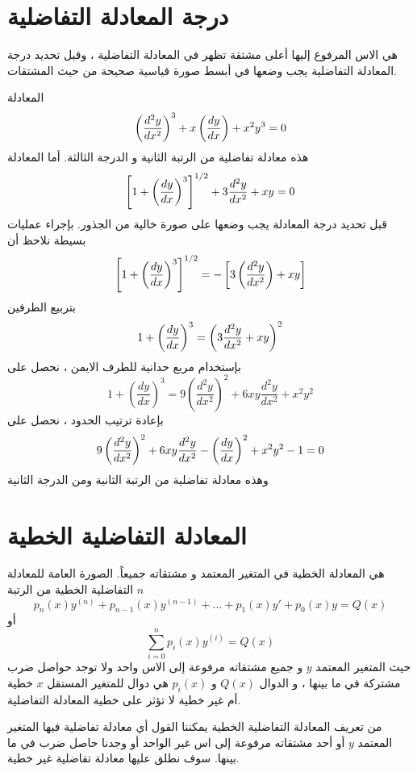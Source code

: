 \section[درجة المعادلة التفاضلية]{درجة المعادلة التفاضلية}
    هي الاس المرفوع إليها أعلى مشتقة تظهر في المعادلة التفاضلية ، وقبل تحديد درجة المعادلة التفاضلية يجب وضعها في أبسط صورة قياسية صحيحة من حيث المشتقات.
\newpage
\begin{example}
    المعادلة
    \[
    \left(\frac{d^2y}{dx^2}\right)^3+x\left(\frac{dy}{dx}\right)+x^2y^3=0
    \]
    هذه معادلة تفاضلية من الرتبة الثانية و الدرجة الثالثة. أما المعادلة 
    \[
    \left[1+\left(\frac{dy}{dx}\right)^3\right]^{1/2}+3\frac{d^2 y}{dx^2}+xy=0
    \]
    قبل تحديد درجة المعادلة يجب وضعها على صورة خالية من الجذور. بإجراء عمليات بسيطة نلاحظ أن
    \[
    \left[1+\left(\frac{dy}{dx}\right)^3\right]^{1/2}=-\left[3\left(\frac{d^2 y}{dx^2}\right)+xy\right]
    \]
    بتربيع الطرفين
    \[
    1+\left(\frac{dy}{dx}\right)^3=\left(3\frac{d^2y}{dx^2}+xy\right)^2
    \]
    بإستخدام مربع حدانية للطرف الايمن ، نحصل على
    \[
    1+ \left(\frac{dy}{dx}\right)^3 = 9 \left(\frac{d^2 y}{dx^2}\right)^2 + 6xy \frac{d^2 y}{dx^2} + x^2 y^2
    \]
    بإعادة ترتيب الحدود ، نحصل على
    \begin{gather*} 9\left(\frac{d^2y}{dx^2}\right)^2+6xy\frac{d^2y}{dx^2}-\left(\frac{dy}{dx}\right)^2+x^2y^2-1=0
    \end{gather*}
    وهذه معادلة تفاضلية من الرتبة الثانية ومن الدرجة الثانية
\end{example}

\section[المعادلة التفاضلية الخطية]{المعادلة التفاضلية الخطية}
    هي المعادلة الخطية في المتغير المعتمد و مشتقاته جميعاً. الصورة العامة للمعادلة التفاضلية الخطية من الرتبة $n$ 
    \[
    p_n(x)y^{(n)}+p_{n-1}(x)y^{(n-1)}+\dots+p_1(x)y'+p_0(x)y=Q(x)
    \]
    أو
    \[
    \sum_{i=0}^{n}p_i(x)y^{(i)}=Q(x)
    \]
    حيث المتغير المعتمد $y$ و جميع مشتقاته مرفوعة إلى الاس واحد ولا توجد حواصل ضرب مشتركة في ما بينها ، و الدوال $Q(x)$ و $p_i(x)$ هي دوال للمتغير المستقل $x$ خطية أم غير خطية لا تؤثر على خطية المعادلة التفاضلية.

\begin{note}
    من تعريف المعادلة التفاضلية الخطية يمكننا القول أي معادلة تفاضلية فيها المتغير المعتمد $y$ أو أحد مشتقاته مرفوعة إلى اس غير الواحد أو وجدنا حاصل ضرب في ما بينها. سوف نطلق عليها معادلة تفاضلية غير خطية.
\end{note}

